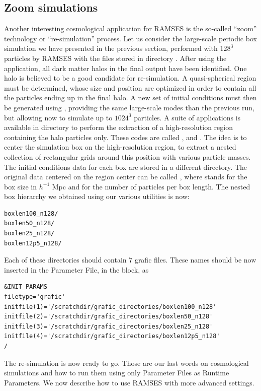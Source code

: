 \subsection{Zoom simulations}

Another interesting cosmological application for RAMSES is the so-called
``zoom'' technology or ``re-simulation'' process. Let us consider the
large-scale periodic box simulation we have presented in the previous
section, performed with $128^3$ particles by RAMSES with the
 files stored in directory .
After using the  application, all dark matter halos in the
final output have been identified. One halo is believed to be a good
candidate for re-simulation. A quasi-spherical region must be
determined, whose size and position are optimized in order to contain
all the particles ending up in the final halo. A new set of initial
conditions must then be generated using , providing the
same large-scale modes than the previous run, but allowing now to
simulate up to $1024^3$ particles.
A suite of applications is available in directory  to
perform the extraction of a high-resolution region containing the halo
particles only. These codes are called ,
 and . The idea is to center
the simulation box on the high-resolution region, to extract a nested
collection of rectangular grids around this position with various
particle masses.  The initial conditions data for each box are stored in
a different directory. The original data centered on the region center
can be called , where  stands for the box
size in $h^{-1}$ Mpc and  for the number of particles per box
length. The nested box hierarchy we obtained using our various utilities
is now:
%
\begin{Verbatim}
boxlen100_n128/
boxlen50_n128/
boxlen25_n128/
boxlen12p5_n128/
\end{Verbatim}
%
Each of these directories should contain 7 grafic files. These names
should be now inserted in the Parameter File, in the
 block, as
%
\begin{Verbatim}
&INIT_PARAMS
filetype='grafic'
initfile(1)='/scratchdir/grafic_directories/boxlen100_n128'
initfile(2)='/scratchdir/grafic_directories/boxlen50_n128'
initfile(3)='/scratchdir/grafic_directories/boxlen25_n128'
initfile(4)='/scratchdir/grafic_directories/boxlen12p5_n128'
/
\end{Verbatim}
%
The re-simulation is now ready to go. Those are our last words on
cosmological simulations and how to run them using only Parameter Files
as Runtime Parameters. We now describe how to use RAMSES with more
advanced settings.
